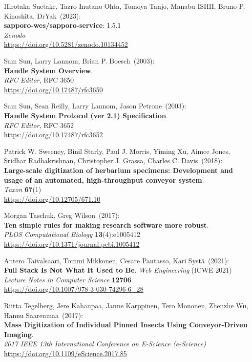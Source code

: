 \begin{thebibliography}{9}
Hirotaka Suetake, Tazro Inutano Ohta, Tomoya Tanjo, Manabu ISHII, Bruno P. Kinoshita, DrYak~(2023): \\
\textbf{sapporo-wes/sapporo-service}: 1.5.1\\
\emph{Zenodo}\\
\url{https://doi.org/10.5281/zenodo.10134452}

Sam Sun, Larry Lannom, Brian P. Boesch~(2003): \\
\textbf{Handle System Overview}.\\
\emph{RFC Editor}, RFC 3650\\
\url{https://doi.org/10.17487/rfc3650}

Sam Sun, Sean Reilly, Larry Lannom, Jason Petrone~(2003): \\
\textbf{Handle System Protocol (ver 2.1) Specification}.\\
\emph{RFC Editor}, RFC 3652\\
\url{https://doi.org/10.17487/rfc3652}

Patrick W. Sweeney, Binil Starly, Paul J. Morris, Yiming Xu, Aimee Jones, Sridhar Radhakrishnan, Christopher J. Grassa, Charles C. Davis~(2018): \\
\textbf{Large-scale digitization of herbarium specimens: Development and usage of an automated, high-throughput conveyor system}.\\
\emph{Taxon} \textbf{67}(1)\\
\url{https://doi.org/10.12705/671.10}

Morgan Taschuk, Greg Wilson~(2017):\\
\textbf{Ten simple rules for making research software more robust}.\\
\emph{PLOS Computational Biology} \textbf{13}(4):e1005412\\
\url{https://doi.org/10.1371/journal.pcbi.1005412}

Antero Taivalsaari, Tommi Mikkonen, Cesare Pautasso, Kari Systä~(2021): \\
\textbf{Full Stack Is Not What It Used to Be}.
\emph{Web Engineering} (ICWE 2021)\\
\emph{Lecture Notes in Computer Science} \textbf{12706} \\
\url{https://doi.org/10.1007/978-3-030-74296-6_28}

Riitta Tegelberg, Jere Kahanpaa, Janne Karppinen, Tero Mononen, Zhenzhe Wu, Hannu Saarenmaa~(2017): \\
\textbf{Mass Digitization of Individual Pinned Insects Using Conveyor-Driven Imaging}.\\
\emph{2017 IEEE 13th International Conference on E-Science (e-Science)}\\
\url{https://doi.org/10.1109/eScience.2017.85}


\end{thebibliography}
